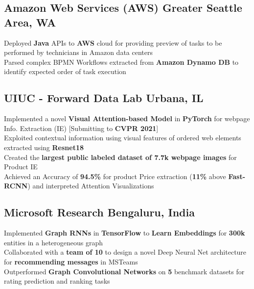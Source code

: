 \documentclass[]{Keval-resume}
\begin{document}
\subsection{Amazon Web Services (AWS) \hfill \normalfont G\lowercase{reater} S\lowercase{eattle} A\lowercase{rea}, WA}
\textbullet{} Deployed \textbf{Java} APIs to \textbf{AWS} cloud for providing preview of tasks to be performed by technicians in Amazon data centers \\
\textbullet{} Parsed complex BPMN Workflows extracted from \textbf{Amazon Dynamo DB} to identify expected order of task execution \\
\sectionsep

\subsection{UIUC - Forward Data Lab \hfill \normalfont U\lowercase{rbana}, IL}
\textbullet{} Implemented a novel \textbf{Visual Attention-based Model} in \textbf{PyTorch} for webpage Info. Extraction (IE) [Submitting to \textbf{CVPR 2021}] \\
\textbullet{} Exploited contextual information using visual features of ordered web elements extracted using \textbf{Resnet18} \\  
\textbullet{} Created the \textbf{largest public labeled dataset of 7.7k webpage images} for Product IE \\
\textbullet{} Achieved an Accuracy of \textbf{94.5\%} for product Price extraction (\textbf{11\%} above \textbf{Fast-RCNN}) and interpreted Attention Visualizations
\sectionsep

\subsection{Microsoft Research \hfill \normalfont B\lowercase{engaluru}, I\lowercase{ndia}}
\textbullet{} Implemented \textbf{Graph RNNs} in \textbf{TensorFlow} to \textbf{Learn Embeddings} for \textbf{300k} entities in a heterogeneous graph \\
\textbullet{} Collaborated with a \textbf{team of 10} to design a novel Deep Neural Net architecture for \textbf{recommending messages} in MSTeams \\
\textbullet{} Outperformed \textbf{Graph Convolutional Networks} on \textbf{5} benchmark datasets for rating prediction and ranking tasks
\sectionsep
\end{document}
